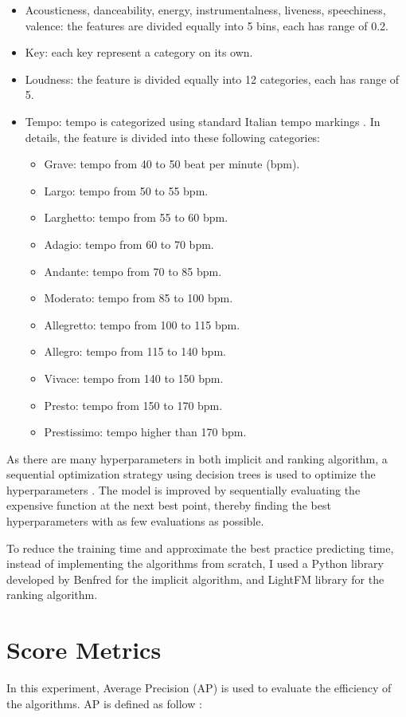 \begin{itemize}
	\item Acousticness, danceability, energy, instrumentalness, liveness, speechiness, valence: the features are divided equally into 5 bins, each has range of 0.2.
	\item Key: each key represent a category on its own.
	\item Loudness: the feature is divided equally into 12 categories, each has range of 5.
	\item Tempo: tempo is categorized using standard Italian tempo markings \cite{2018Tempo}. In details, the feature is divided into these following categories:
	\begin{itemize}
		\item Grave: tempo from 40 to 50 beat per minute (bpm).
		\item Largo: tempo from 50 to 55 bpm.
		\item Larghetto: tempo from 55 to 60 bpm.
		\item Adagio: tempo from 60 to 70 bpm.
		\item Andante: tempo from 70 to 85 bpm.
		\item Moderato: tempo from 85 to 100 bpm.
		\item Allegretto: tempo from 100 to 115 bpm.
		\item Allegro: tempo from 115 to 140 bpm.
		\item Vivace: tempo from 140 to 150 bpm.
		\item Presto: tempo from 150 to 170 bpm.
		\item Prestissimo: tempo higher than 170 bpm.
\end{itemize}	  
\end{itemize}

As there are many hyperparameters in both implicit and ranking algorithm, a sequential optimization strategy using decision trees is used to optimize the hyperparameters \cite{ForestMinimize2018}. The model is improved by sequentially evaluating the expensive function at the next best point, thereby finding the best hyperparameters with as few evaluations as possible. 

To reduce the training time and approximate the best practice predicting time, instead of implementing the algorithms from scratch, I used a Python library developed by Benfred \cite{Benfred2018} for the implicit algorithm, and LightFM library \cite{DBLP:conf/recsys/Kula15} for the ranking algorithm.

\section{Score Metrics}
In this experiment, Average Precision (AP) is used to evaluate the efficiency of the algorithms. AP is defined as follow \cite{liu2009learning}:

